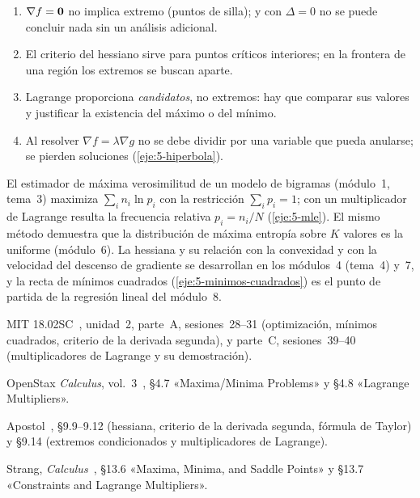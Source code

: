 \begin{observacion}
\begin{enumerate}[label=(\alph*)]
\item $\nabla f=\mathbf{0}$ no implica extremo (puntos de silla); y con $\Delta=0$ no se puede concluir nada sin un análisis adicional.
\item El criterio del hessiano sirve para puntos críticos interiores; en la frontera de una región los extremos se buscan aparte.
\item Lagrange proporciona \emph{candidatos}, no extremos: hay que comparar sus valores y justificar la existencia del máximo o del mínimo.
\item Al resolver $\nabla f=\lambda\nabla g$ no se debe dividir por una variable que pueda anularse; se pierden soluciones (\cref{eje:5-hiperbola}).
\end{enumerate}
\end{observacion}

\begin{observacion}
El estimador de máxima verosimilitud de un modelo de bigramas (módulo~1, tema~3) maximiza $\sum_i n_i\ln p_i$ con la restricción $\sum_ip_i=1$; con un multiplicador de Lagrange resulta la frecuencia relativa $p_i=n_i/N$ (\cref{eje:5-mle}). El mismo método demuestra que la distribución de máxima entropía sobre $K$ valores es la uniforme (módulo~6). La hessiana y su relación con la convexidad y con la velocidad del descenso de gradiente se desarrollan en los módulos~4 (tema~4) y~7, y la recta de mínimos cuadrados (\cref{eje:5-minimos-cuadrados}) es el punto de partida de la regresión lineal del módulo~8.
\end{observacion}

\begin{lecturas}
\item MIT 18.02SC~\cite{mit1802}, unidad~2, parte~A, sesiones~28--31 (optimización, mínimos cuadrados, criterio de la derivada segunda), y parte~C, sesiones~39--40 (multiplicadores de Lagrange y su demostración).
\item OpenStax \emph{Calculus}, vol.~3~\cite{openstax3}, §4.7 «Maxima/Minima Problems» y §4.8 «Lagrange Multipliers».
\item Apostol~\cite{apostol2}, §9.9--9.12 (hessiana, criterio de la derivada segunda, fórmula de Taylor) y §9.14 (extremos condicionados y multiplicadores de Lagrange).
\item Strang, \emph{Calculus}~\cite{strangcalc}, §13.6 «Maxima, Minima, and Saddle Points» y §13.7 «Constraints and Lagrange Multipliers».
\end{lecturas}

